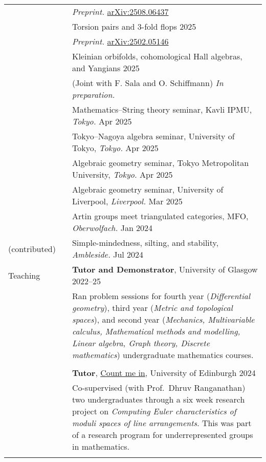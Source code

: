 \documentclass[10pt]{article}
\newcommand{\nextItem}{\\[0.25em]}
\newcommand{\nextSection}{\\[0.5em]}
\begin{document}
\begin{longtable}{>{\raggedleft\arraybackslash}p{0.8in}>{}p{0.05in}>{}p{5.7in}}
        && \emph{Preprint.}
        \href{https://arxiv.org/abs/2508.06437}{arXiv:2508.06437}
        \nextItem
        && Torsion pairs and 3-fold flops \hfill 2025\\
        && \emph{Preprint.}
        \href{https://arxiv.org/abs/2502.05146}{arXiv:2502.05146}
        \nextItem
        && Kleinian orbifolds, cohomological Hall algebras, and Yangians
           \hfill 2025\\
        && (Joint with F. Sala and O. Schiffmann) \emph{In preparation.}
        \nextSection
    \multirow{2}{0.8in}{\raggedleft\arraybackslash Selected talks (invited)}%
        && Mathematics--String theory seminar, Kavli IPMU, \emph{Tokyo.}
        \hfill Apr 2025\nextItem
        && Tokyo--Nagoya algebra seminar, University of Tokyo, \emph{Tokyo.}
        \hfill Apr 2025\nextItem
        && Algebraic geometry seminar, Tokyo Metropolitan University, \emph{Tokyo.}
        \hfill Apr 2025\nextItem
        && Algebraic geometry seminar, University of Liverpool, \emph{Liverpool.}
        \hfill Mar 2025\nextItem
        && Artin groups meet triangulated categories, MFO, \emph{Oberwolfach.}
        \hfill Jan 2024\nextItem
    (contributed)%
        && Simple-mindedness, silting, and stability, \emph{Ambleside.}
        \hfill Jul 2024\nextSection
    Teaching%
        && \textbf{Tutor and Demonstrator}, University of Glasgow \hfill
        2022--25\\[0.25em]
        && \begin{minipage}[c]{4.3in}
        Ran problem sessions for fourth year (\emph{Differential geometry}),
        third year (\emph{Metric and topological spaces}), and second year
        (\emph{Mechanics, Multivariable calculus, Mathematical methods and
        modelling, Linear algebra, Graph theory, Discrete mathematics})
        undergraduate mathematics courses.
        \end{minipage}\\\\[-0.6em]
        && \textbf{Tutor}, \href{https://www.agq-cdt.org/count-me-in/}{Count me
        in}, University of Edinburgh \hfill 2024\\[0.25em]
        && \begin{minipage}[c]{4.3in}
        Co-supervised (with Prof.\ Dhruv Ranganathan) two undergraduates
        through a six week research project on \emph{Computing Euler
        characteristics of moduli spaces of line arrangements}. This was part of
        a research program for underrepresented groups in mathematics.
        \end{minipage}\\\\[-0.6em]

\end{longtable}
\end{document}
